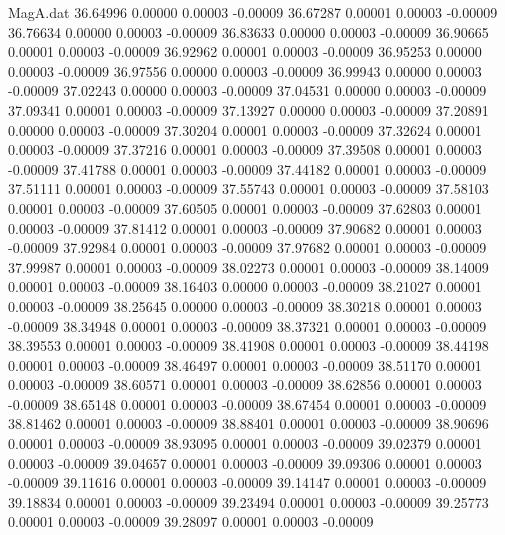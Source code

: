 \begin{filecontents}{MagA.dat}
  36.64996    0.00000    0.00003   -0.00009
  36.67287    0.00001    0.00003   -0.00009
  36.76634    0.00000    0.00003   -0.00009
  36.83633    0.00000    0.00003   -0.00009
  36.90665    0.00001    0.00003   -0.00009
  36.92962    0.00001    0.00003   -0.00009
  36.95253    0.00000    0.00003   -0.00009
  36.97556    0.00000    0.00003   -0.00009
  36.99943    0.00000    0.00003   -0.00009
  37.02243    0.00000    0.00003   -0.00009
  37.04531    0.00000    0.00003   -0.00009
  37.09341    0.00001    0.00003   -0.00009
  37.13927    0.00000    0.00003   -0.00009
  37.20891    0.00000    0.00003   -0.00009
  37.30204    0.00001    0.00003   -0.00009
  37.32624    0.00001    0.00003   -0.00009
  37.37216    0.00001    0.00003   -0.00009
  37.39508    0.00001    0.00003   -0.00009
  37.41788    0.00001    0.00003   -0.00009
  37.44182    0.00001    0.00003   -0.00009
  37.51111    0.00001    0.00003   -0.00009
  37.55743    0.00001    0.00003   -0.00009
  37.58103    0.00001    0.00003   -0.00009
  37.60505    0.00001    0.00003   -0.00009
  37.62803    0.00001    0.00003   -0.00009
  37.81412    0.00001    0.00003   -0.00009
  37.90682    0.00001    0.00003   -0.00009
  37.92984    0.00001    0.00003   -0.00009
  37.97682    0.00001    0.00003   -0.00009
  37.99987    0.00001    0.00003   -0.00009
  38.02273    0.00001    0.00003   -0.00009
  38.14009    0.00001    0.00003   -0.00009
  38.16403    0.00000    0.00003   -0.00009
  38.21027    0.00001    0.00003   -0.00009
  38.25645    0.00000    0.00003   -0.00009
  38.30218    0.00001    0.00003   -0.00009
  38.34948    0.00001    0.00003   -0.00009
  38.37321    0.00001    0.00003   -0.00009
  38.39553    0.00001    0.00003   -0.00009
  38.41908    0.00001    0.00003   -0.00009
  38.44198    0.00001    0.00003   -0.00009
  38.46497    0.00001    0.00003   -0.00009
  38.51170    0.00001    0.00003   -0.00009
  38.60571    0.00001    0.00003   -0.00009
  38.62856    0.00001    0.00003   -0.00009
  38.65148    0.00001    0.00003   -0.00009
  38.67454    0.00001    0.00003   -0.00009
  38.81462    0.00001    0.00003   -0.00009
  38.88401    0.00001    0.00003   -0.00009
  38.90696    0.00001    0.00003   -0.00009
  38.93095    0.00001    0.00003   -0.00009
  39.02379    0.00001    0.00003   -0.00009
  39.04657    0.00001    0.00003   -0.00009
  39.09306    0.00001    0.00003   -0.00009
  39.11616    0.00001    0.00003   -0.00009
  39.14147    0.00001    0.00003   -0.00009
  39.18834    0.00001    0.00003   -0.00009
  39.23494    0.00001    0.00003   -0.00009
  39.25773    0.00001    0.00003   -0.00009
  39.28097    0.00001    0.00003   -0.00009

\end{filecontents}

